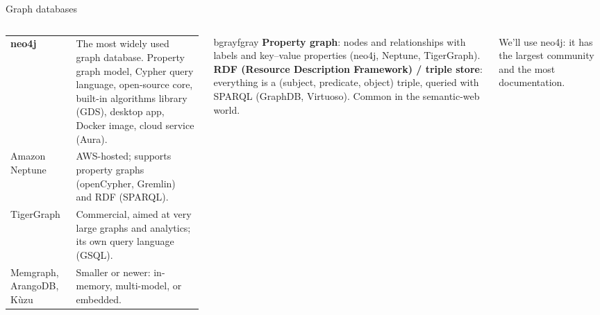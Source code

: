 \documentclass[aspectratio=169, 10pt]{beamer}
\begin{document}
\begin{frame}[fragile]{Graph databases}
  \vspace{0.2cm}
  \begin{columns}[T]
      \small
      \begin{tabular}{@{}p{2.6cm}p{4.6cm}@{}}\toprule
        \textbf{neo4j} & The most widely used graph database. Property graph model, Cypher query language, open-source core, built-in algorithms library (GDS), desktop app, Docker image, cloud service (Aura).\\[4pt]
        Amazon Neptune & AWS-hosted; supports property graphs (openCypher, Gremlin) and RDF (SPARQL).\\[4pt]
        TigerGraph & Commercial, aimed at very large graphs and analytics; its own query language (GSQL).\\[4pt]
        Memgraph, ArangoDB, K\`uzu & Smaller or newer: in-memory, multi-model, or embedded.\\ \bottomrule
      \end{tabular}
      \begin{tbox}{bgray}{fgray}
        \textbf{Property graph}: nodes and relationships with labels and key--value properties (neo4j, Neptune, TigerGraph).\\[3pt]
        \textbf{RDF (Resource Description Framework) / triple store}: everything is a (subject, predicate, object) triple, queried with SPARQL (GraphDB, Virtuoso). Common in the semantic-web world.
      \end{tbox}
      \vspace{0.2cm}
      \small
      We'll use neo4j: it has the largest community and the most documentation.
  \end{columns}
\end{frame}
\end{document}
